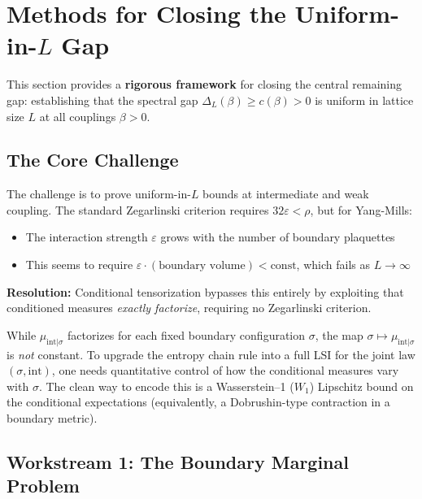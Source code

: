 \section{Methods for Closing the Uniform-in-\texorpdfstring{$L$}{L} Gap}
\label{sec:uniform-gap-closure}

This section provides a \textbf{rigorous framework} for closing the central remaining gap:
establishing that the spectral gap $\Delta_L(\beta) \geq c(\beta) > 0$ is uniform in 
lattice size $L$ at all couplings $\beta > 0$.

\subsection{The Core Challenge}

The challenge is to prove uniform-in-$L$ bounds at intermediate and weak coupling.
The standard Zegarlinski criterion requires $32\varepsilon < \rho$, but for Yang-Mills:
\begin{itemize}
\item The interaction strength $\varepsilon$ grows with the number of boundary plaquettes
\item This seems to require $\varepsilon \cdot (\text{boundary volume}) < \text{const}$, which fails as $L \to \infty$
\end{itemize}

\textbf{Resolution:} Conditional tensorization bypasses this entirely by exploiting
that conditioned measures \emph{exactly factorize}, requiring no Zegarlinski criterion.

\begin{remark}
\label{rem:boundary-metric-why}
While $\mu_{\mathrm{int}|\sigma}$ factorizes for each fixed boundary configuration $\sigma$, the map
$\sigma \mapsto \mu_{\mathrm{int}|\sigma}$ is \emph{not} constant. To upgrade the entropy chain rule
into a full LSI for the joint law $(\sigma,\mathrm{int})$, one needs quantitative control of how
the conditional measures vary with $\sigma$. The clean way to encode this is a Wasserstein--1
($W_1$) Lipschitz bound on the conditional expectations (equivalently, a Dobrushin-type
contraction in a boundary metric).
\end{remark}

\subsection{Workstream 1: The Boundary Marginal Problem}

